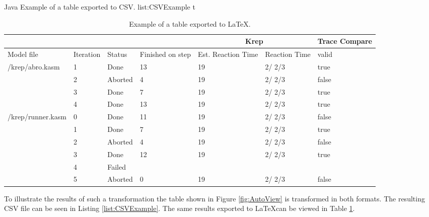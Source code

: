 \listingjava
{}
{Java}
{Example of a table exported to CSV.}
{list:CSVExample}
{t}
\begin{table}[b]
\begin{tabular}{| l | p{1.2cm} | p{1.2cm} | p{1.2cm} | p{1cm} | p{1.4cm} | p{0.5cm} | } \hline
\multicolumn{4}{|c|}{}
 & \multicolumn{2}{c|}{Krep}
 & \multicolumn{1}{c|}{Trace Compare}
\\ \hline
Model file & Iteration & Status & Finished on step & Est. Reaction Time & Reaction Time & valid \\ \hline
\multirow{4}{*}{/krep/abro.kasm} & 1 & Done & 13 & 19 & {2/ 2/3} & true \\ 
 & 2 & Aborted & 4 & 19 & {2/ 2/3} & false \\ 
 & 3 & Done & 7 & 19 & {2/ 2/3} & true \\ 
 & 4 & Done & 13 & 19 & {2/ 2/3} & true \\ 
\hline
\multirow{6}{*}{/krep/runner.kasm} & 0 & Done & 11 & 19 & {2/ 2/3} & false \\ 
 & 1 & Done & 7 & 19 & {2/ 2/3} & true \\ 
 & 2 & Aborted & 4 & 19 & {2/ 2/3} & false \\ 
 & 3 & Done & 12 & 19 & {2/ 2/3} & true \\ 
 & 4 & Failed &  &  &  &  \\ 
 & 5 & Aborted & 0 & 19 & {2/ 2/3} & false \\ 
\hline
\end{tabular}
  \caption[Example of a table exported to \LaTeX .]%
  {Example of a table exported to \LaTeX .\protect}
\label{table:LatexExample}
\end{table}
To illustrate the results of such a transformation the table shown in Figure \ref{fig:AutoView} is
transformed in both formats. The resulting \ac{CSV} file can be seen in Listing \ref{list:CSVExample}. The same
results exported to \LaTeX can be viewed in Table \ref{table:LatexExample}.